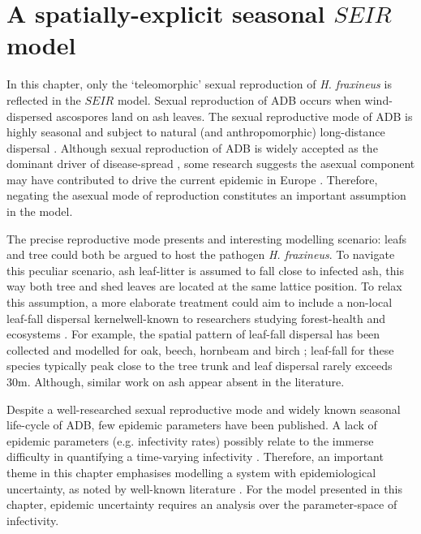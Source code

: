 \section{A spatially-explicit seasonal $SEIR$ model}
\label{sec:seir-model}

In this chapter, only the `teleomorphic' sexual reproduction of \textit{H. fraxineus} is reflected in the $SEIR$ model.
Sexual reproduction of ADB occurs when wind-dispersed ascospores land on ash leaves.
The sexual reproductive mode of ADB is highly seasonal and subject to natural (and anthropomorphic) long-distance dispersal \cite{grosdidier2018tracking}. 
Although sexual reproduction of ADB is widely accepted as the dominant driver of disease-spread \cite{https://doi.org/10.1111/ppa.12844, havnavckova2017direct, gross2012reproductive, Timmermann2011elal},
some research suggests the asexual component may have contributed to drive the current epidemic in Europe \cite{fones2016role}.
Therefore, negating the asexual mode of reproduction constitutes an important assumption in the model.

The precise reproductive mode presents and interesting modelling scenario: leafs and tree could both be argued to host the pathogen \textit{H. fraxineus}.
To navigate this peculiar scenario, ash leaf-litter is assumed to fall close to infected ash, 
this way both tree and shed leaves are located at the same lattice position.
To relax this assumption, a more elaborate treatment could aim to include a non-local leaf-fall dispersal kernel\textemdash well-known to researchers studying forest-health and ecosystems \cite{staelens2003model}.
For example, the spatial pattern of leaf-fall dispersal has been collected and modelled for oak, beech, hornbeam and birch \cite{nickmans2019modelling};
leaf-fall for these species typically peak close to the tree trunk and leaf dispersal rarely exceeds $30\mathrm{m}$.
Although, similar work on ash appear absent in the literature.

Despite a well-researched sexual reproductive mode and widely known seasonal life-cycle of ADB, few epidemic parameters have been published.
A lack of epidemic parameters (e.g. infectivity rates) possibly relate to the immerse difficulty in quantifying a time-varying infectivity \cite{13-challenges}.
Therefore, an important theme in this chapter emphasises modelling a system with epidemiological uncertainty, 
as noted by well-known literature \cite{13-challenges, WEBIDEMICS}.
For the model presented in this chapter, epidemic uncertainty requires an analysis over the parameter-space of infectivity.

